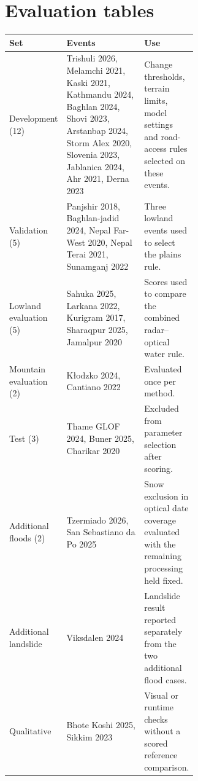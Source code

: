 \documentclass[10pt,twocolumn,letterpaper]{article}
\renewcommand{\arraystretch}{1.1}
\begin{document}
\clearpage
\onecolumn
\appendix
\section{Evaluation tables}
\renewcommand{\arraystretch}{1.0}

\par\noindent\begin{minipage}{\linewidth}
\label{tab:events}
\fontsize{8.2}{9.6}\selectfont
\begin{tabularx}{\linewidth}{@{}P{0.15\linewidth}P{0.46\linewidth}L@{}}
\toprule
Set & Events & Use \\
\midrule
Development (12) & Trishuli 2026, Melamchi 2021, Kaski 2021, Kathmandu 2024, Baghlan 2024, Shovi
2023, Arstanbap 2024, Storm Alex 2020, Slovenia 2023, Jablanica 2024, Ahr 2021, Derna 2023 & Change
thresholds, terrain limits, model settings and road-access rules selected on these events. \\
Validation (5) & Panjshir 2018, Baghlan-jadid 2024, Nepal Far-West 2020, Nepal Terai 2021,
Sunamganj 2022 & Three lowland events used to select the plains rule. \\
Lowland evaluation (5) & Sahuka 2025, Larkana 2022, Kurigram 2017, Sharaqpur 2025, Jamalpur 2020 &
Scores used to compare the combined radar--optical water rule. \\
Mountain evaluation (2) & K\l{}odzko 2024, Cantiano 2022 & Evaluated once per method. \\
Test (3) & Thame GLOF 2024, Buner 2025, Charikar 2020 & Excluded from parameter selection after scoring. \\
Additional floods (2) & Tzermiado 2026, San Sebastiano da Po 2025 & Snow exclusion in optical
date coverage evaluated with the remaining processing held fixed. \\
Additional landslide & Viksdalen 2024 & Landslide result reported separately from the two additional
flood cases. \\
Qualitative & Bhote Koshi 2025, Sikkim 2023 & Visual or runtime checks without a scored reference
comparison. \\
\bottomrule
\end{tabularx}
\end{minipage}\par\vspace{8pt}
\end{document}
